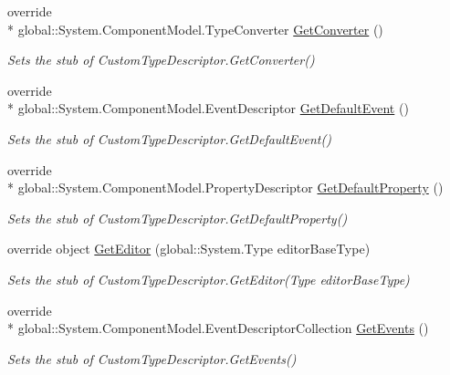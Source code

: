 \begin{DoxyCompactItemize}
override \\*
global\-::\-System.\-Component\-Model.\-Type\-Converter \hyperlink{class_system_1_1_component_model_1_1_fakes_1_1_stub_custom_type_descriptor_a005e2979562c78cbc537689046add0fc}{Get\-Converter} ()
\begin{DoxyCompactList}\small\item\em Sets the stub of Custom\-Type\-Descriptor.\-Get\-Converter()\end{DoxyCompactList}\item 
override \\*
global\-::\-System.\-Component\-Model.\-Event\-Descriptor \hyperlink{class_system_1_1_component_model_1_1_fakes_1_1_stub_custom_type_descriptor_a93e76d1b1ed4fa1bacad9c003ad58b92}{Get\-Default\-Event} ()
\begin{DoxyCompactList}\small\item\em Sets the stub of Custom\-Type\-Descriptor.\-Get\-Default\-Event()\end{DoxyCompactList}\item 
override \\*
global\-::\-System.\-Component\-Model.\-Property\-Descriptor \hyperlink{class_system_1_1_component_model_1_1_fakes_1_1_stub_custom_type_descriptor_ad6ee4d4ea296ba658d6d460c5f4dadfb}{Get\-Default\-Property} ()
\begin{DoxyCompactList}\small\item\em Sets the stub of Custom\-Type\-Descriptor.\-Get\-Default\-Property()\end{DoxyCompactList}\item 
override object \hyperlink{class_system_1_1_component_model_1_1_fakes_1_1_stub_custom_type_descriptor_afef6d1dfbbdf36c44914c697ad14d5b0}{Get\-Editor} (global\-::\-System.\-Type editor\-Base\-Type)
\begin{DoxyCompactList}\small\item\em Sets the stub of Custom\-Type\-Descriptor.\-Get\-Editor(\-Type editor\-Base\-Type)\end{DoxyCompactList}\item 
override \\*
global\-::\-System.\-Component\-Model.\-Event\-Descriptor\-Collection \hyperlink{class_system_1_1_component_model_1_1_fakes_1_1_stub_custom_type_descriptor_a3b88c3afec0f7121ab9d9b2e192e8882}{Get\-Events} ()
\begin{DoxyCompactList}\small\item\em Sets the stub of Custom\-Type\-Descriptor.\-Get\-Events()\end{DoxyCompactList}\item 

\end{DoxyCompactItemize}
